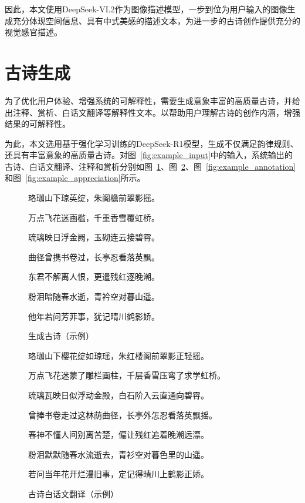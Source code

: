因此，本文使用DeepSeek-VL2作为图像描述模型，一步到位为用户输入的图像生成充分体现空间信息、具有中式美感的描述文本，为进一步的古诗创作提供充分的视觉感官描述。

\section{古诗生成} \label{sec:poem_generation}

为了优化用户体验、增强系统的可解释性，需要生成意象丰富的高质量古诗，并给出注释、赏析、白话文翻译等解释性文本。以帮助用户理解古诗的创作内涵，增强结果的可解释性。

为此，本文选用基于强化学习训练的DeepSeek-R1模型，生成不仅满足韵律规则、还具有丰富意象的高质量古诗。对图~\ref{fig:example_input}中的输入，系统输出的古诗、白话文翻译、注释和赏析分别如图~\ref{fig:example_poem}、图~\ref{fig:example_translation}、图~\ref{fig:example_annotation}和图~\ref{fig:example_appreciation}所示。


\begin{figure}[ht]
  \centering
  \begin{tcolorbox}[
      colback=white,
      colframe=black,
      boxrule=1pt,
      arc=0mm,
      width=0.6\linewidth,  %
      ]
      \kaishu
      \centering
      珞珈山下琼英绽，朱阁檐前翠影摇。\par
      万点飞花迷画槛，千重香雪覆虹桥。\par
      琉璃映日浮金阙，玉砌连云接碧霄。\par
      曲径曾携书卷过，长亭忍看落英飘。\par
      东君不解离人恨，更遣残红逐晚潮。\par
      粉泪暗随春水逝，青衿空对暮山遥。\par
      他年若问芳菲事，犹记晴川鹤影娇。\par
  \end{tcolorbox}
  \caption{生成古诗（示例）}
  \label{fig:example_poem}
\end{figure}

\begin{figure}[ht]
  \centering
  \begin{tcolorbox}[
      colback=white,
      colframe=black,
      boxrule=1pt,
      arc=0mm,
      width=0.8\linewidth,  %
      ]
      \kaishu
      \centering
      珞珈山下樱花绽如琼瑶，朱红楼阁前翠影正轻摇。\par
      万点飞花迷蒙了雕栏画柱，千层香雪压弯了求学虹桥。\par
      琉璃瓦映日似浮动金殿，白石阶入云直通向碧霄。\par
      曾捧书卷走过这林荫曲径，长亭外怎忍看落英飘摇。\par
      春神不懂人间别离苦楚，偏让残红追着晚潮远漂。\par
      粉泪默默随春水流逝去，青衫空对暮色里的山遥。\par
      若问当年花开烂漫旧事，定记得晴川上鹤影正娇。\par
  \end{tcolorbox}
  \caption{古诗白话文翻译（示例）}
  \label{fig:example_translation} %
\end{figure}

